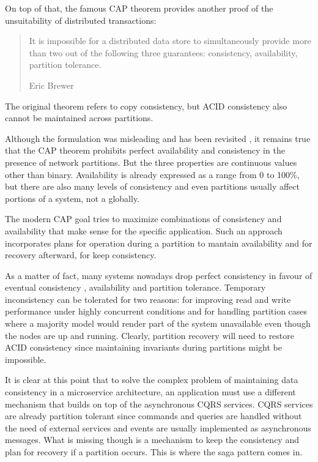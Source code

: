 \documentclass[conference]{IEEEtran}
\begin{document}
On top of that, the famous CAP theorem provides another proof of the unsuitability of distributed transactions:

\begin{quote}
It is impossible for a distributed data store to simultaneously provide more than two out of the following three guarantees: consistency, availability, partition tolerance.

\hfill Eric Brewer
\end{quote}

The original theorem refers to copy consistency, but ACID consistency also cannot be maintained across partitions. 

Although the formulation was misleading and has been revisited \cite{acid-cap}, it remains true that the CAP theorem prohibits perfect availability and consistency in the presence of network partitions. But the three properties are continuous values other than binary. Availability is already expressed as a range from 0 to 100\%, but there are also many levels of consistency and even partitions usually affect portions of a system, not a globally.

The modern CAP goal tries to maximize combinations of consistency and availability that make sense for the specific application. Such an approach incorporates plans for operation during a partition to mantain availability and for recovery afterward, for keep consistency.

As a matter of fact, many systems nowadays drop perfect consistency in favour of eventual consistency \cite{consistency-vs-availability}, availability and partition tolerance. Temporary inconsistency can be tolerated for two reasons: for improving read and write performance under highly concurrent conditions and for handling partition cases where a majority model would render part of the system unavailable even though the nodes are up and running. Clearly, partition recovery will need to restore ACID consistency since maintaining invariants during partitions might be impossible.

It is clear at this point that to solve the complex problem of maintaining data consistency in a microservice architecture, an application must use a different mechanism that builds on top of the asynchronous CQRS services. CQRS services are already partition tolerant since commands and queries are handled without the need of external services and events are usually implemented as asynchronous messages. What is missing though is a mechanism to keep the consistency and plan for recovery if a partition occurs. This is where the saga pattern comes in.
\end{document}
